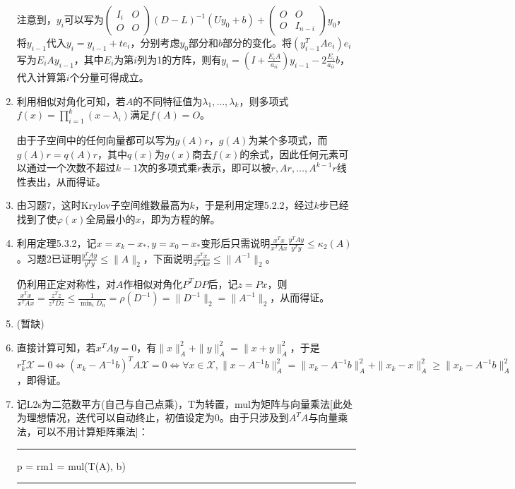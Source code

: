 \documentclass[a4paper,UTF8,fontset=windows]{ctexart}
\newenvironment{code}{\rule{36em}{0.1em}\setlength{\parindent}{1em}\setmainfont{Consolas}

}{

\setlength{\parindent}{0em}\rule{36em}{0.1em}}
\begin{document}
\begin{enumerate}
注意到，$y_i$可以写为$\begin{pmatrix}I_i&O\\O&O\end{pmatrix}(D-L)^{-1}(Uy_0+b)+\begin{pmatrix}O&O\\O&I_{n-i}\end{pmatrix}y_0$，将$y_{i-1}$代入$y_i=y_{i-1}+te_i$，分别考虑$y_0$部分和$b$部分的变化。将$(y_{i-1}^TAe_i)e_i$写为$E_iAy_{i-1}$，其中$E_i$为第$i$列为1的方阵，则有$y_i=(I+\frac{E_iA}{a_{ii}})y_{i-1}-2\frac{E_i}{a_{ii}}b$，代入计算第$i$个分量可得成立。

\item
利用相似对角化可知，若$A$的不同特征值为$\lambda_1,\dots,\lambda_k$，则多项式$f(x)=\prod_{i=1}^k(x-\lambda_i)$满足$f(A)=O$。

由于子空间中的任何向量都可以写为$g(A)r$，$g(A)$为某个多项式，而$g(A)r=q(A)r$，其中$q(x)$为$g(x)$商去$f(x)$的余式，因此任何元素可以通过一个次数不超过$k-1$次的多项式乘$r$表示，即可以被$r,Ar,\dots,A^{k-1}r$线性表出，从而得证。

\item
由习题7，这时Krylov子空间维数最高为$k$，于是利用定理5.2.2，经过$k$步已经找到了使$\varphi(x)$全局最小的$x$，即为方程的解。

\item
利用定理5.3.2，记$x=x_k-x_*,y=x_0-x_*$变形后只需说明$\frac{x^Tx}{x^TAx}\frac{y^TAy}{y^Ty}\le\kappa_2(A)$。习题2已证明$\frac{y^TAy}{y^Ty}\le\|A\|_2$，下面说明$\frac{x^Tx}{x^TAx}\le\|A^{-1}\|_2$。

仍利用正定对称性，对$A$作相似对角化$P^TDP$后，记$z=Px$，则$\frac{x^Tx}{x^TAx}=\frac{z^Tz}{z^TDz}\le\frac{1}{\min_iD_{ii}}=\rho(D^{-1})=\|D^{-1}\|_2=\|A^{-1}\|_2$，从而得证。

\item
(暂缺)

\item
直接计算可知，若$x^TAy=0$，有$\|x\|_A^2+\|y\|_A^2=\|x+y\|_A^2$，于是$r_k^T\mathcal{X}=0\Leftrightarrow(x_k-A^{-1}b)^TA\mathcal{X}=0\Leftrightarrow\forall x\in\mathcal{X},\|x-A^{-1}b\|_A^2=\|x_k-A^{-1}b\|_A^2+\|x_k-x\|_A^2\ge\|x_k-A^{-1}b\|_A^2$，即得证。

\item
记L2s为二范数平方(自己与自己点乘)，T为转置，mul为矩阵与向量乘法[此处为理想情况，迭代可以自动终止，初值设定为0。由于只涉及到$A^TA$与向量乘法，可以不用计算矩阵乘法]：

\begin{code}
p = rm1 = mul(T(A), b)


\end{code}
\end{enumerate}
\end{document}
